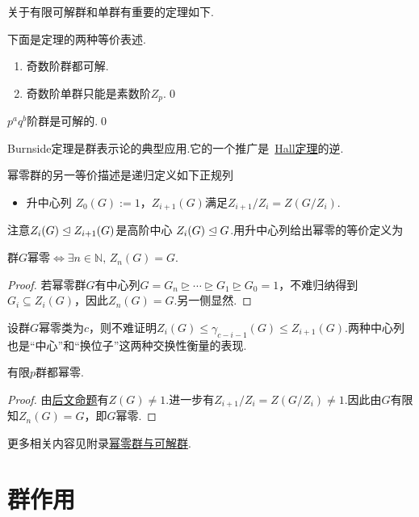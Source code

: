 关于有限可解群和单群有重要的定理如下.
\begin{thm}
	下面是定理的两种等价表述.
	\begin{enumerate}
		\item 奇数阶群都可解.
		\item 奇数阶单群只能是素数阶$Z_p$.\qed
	\end{enumerate}
\end{thm}
\begin{thm}[(Burnside)]
	$p^aq^b$阶群是可解的.\qed
\end{thm}
\begin{remark}
	Burnside定理是群表示论的典型应用.它的一个推广是~\hyperlink{thm:Hall}{Hall定理}的逆.
\end{remark}

幂零群的另一等价描述是递归定义如下正规列
\begin{itemize}
	\item {\heiti 升中心列} $Z_0(G):=1$，$Z_{i+1}(G)$满足$Z_{i+1}/Z_i=Z(G/Z_i)$.
\end{itemize}
注意$Z_i(G)\trianglelefteq Z_{i+1}(G)$是{\heiti 高阶中心} $Z_i(G)\trianglelefteq G$.用升中心列给出幂零的等价定义为
\begin{prop}
	群$G$幂零$\iff\exists n\in\mathbb{N},\,Z_n(G)=G$.
\end{prop}
\begin{proof}
	若幂零群$G$有中心列$G=G_n\trianglerighteq\cdots\trianglerighteq G_1\trianglerighteq G_0=1$，不难归纳得到$G_i\subseteq Z_i(G)$，因此$Z_n(G)=G$.另一侧显然.
\end{proof}
\begin{remark}
	设群$G$幂零类为$c$，则不难证明$Z_i(G)\le \gamma_{c-i-1}(G)\le Z_{i+1}(G)$.两种中心列也是“中心”和“换位子”这两种交换性衡量的表现.
\end{remark}
\begin{prop}
	有限$p$群都幂零.
\end{prop}
\begin{proof}
	由\hyperlink{prop:NormalityLargeOfpGrp}{后文命题}有$Z(G)\ne 1$.进一步有$Z_{i+1}/Z_i=Z(G/Z_i)\ne 1$.因此由$G$有限知$Z_n(G)=G$，即$G$幂零.
\end{proof}

更多相关内容见附录\hyperlink{subsec:NilpotentSolvable}{幂零群与可解群}.

\section{群作用}
